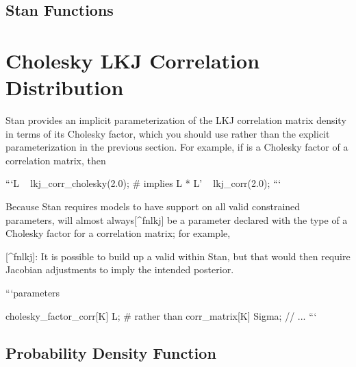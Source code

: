 \begin{description}
{\begin{description}


\subsection{Stan Functions}


\begin{description}    \end{description}


\begin{description}  \end{description}


\section{Cholesky LKJ Correlation Distribution}


Stan provides an implicit parameterization of the LKJ correlation matrix density in terms of its Cholesky factor, which you should use rather than the explicit parameterization in the previous section. For example, if  is a Cholesky factor of a correlation matrix, then


```\n L ~ lkj_corr_cholesky(2.0); # implies L * L' ~ lkj_corr(2.0); \n```


Because Stan requires models to have support on all valid constrained parameters,  will almost always[^fnlkj] be a parameter declared with the type of a Cholesky factor for a correlation matrix; for example,

[^fnlkj]: It is possible to build up a valid  within Stan, but that would then require Jacobian adjustments to imply the intended posterior.

```\n parameters {   cholesky_factor_corr[K] L;   # rather than corr_matrix[K] Sigma;   // ... \n```



\subsection{Probability Density Function}


}
\end{description}}
\end{description}
